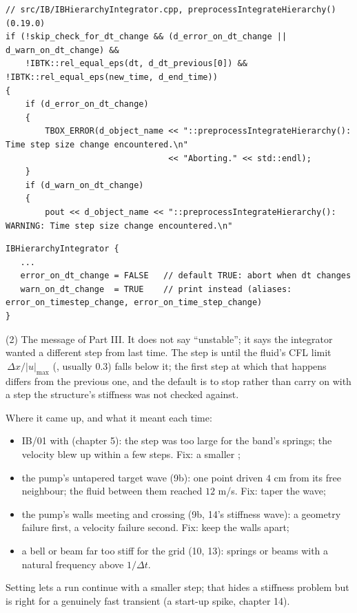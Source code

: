 \documentclass[aspectratio=169,11pt]{beamer}
\begin{document}
\begin{frame}[fragile]{}
\label{fr:cfl}
\begin{lstlisting}[style=cpptiny]
// src/IB/IBHierarchyIntegrator.cpp, preprocessIntegrateHierarchy() (0.19.0)
if (!skip_check_for_dt_change && (d_error_on_dt_change || d_warn_on_dt_change) &&
    !IBTK::rel_equal_eps(dt, d_dt_previous[0]) && !IBTK::rel_equal_eps(new_time, d_end_time))
{
    if (d_error_on_dt_change)
    {
        TBOX_ERROR(d_object_name << "::preprocessIntegrateHierarchy():  Time step size change encountered.\n"
                                 << "Aborting." << std::endl);
    }
    if (d_warn_on_dt_change)
    {
        pout << d_object_name << "::preprocessIntegrateHierarchy():  WARNING: Time step size change encountered.\n"
\end{lstlisting}
\begin{lstlisting}[style=inputtiny]
IBHierarchyIntegrator {
   ...
   error_on_dt_change = FALSE   // default TRUE: abort when dt changes
   warn_on_dt_change  = TRUE    // print instead (aliases: error_on_timestep_change, error_on_time_step_change)
}
\end{lstlisting}

\end{frame}

\begin{frame}[fragile]{ (2)}
\label{fr:cfl2}
\footnotesize The message of Part III. It does not say ``unstable''; it says the integrator wanted a different step from last time. The step is  until the fluid's CFL limit $\,\Delta x/|u|_{\max}$ (, usually $0.3$) falls below it; the first step at which that happens differs from the previous one, and the default is to stop rather than carry on with a step the structure's stiffness was not checked against.
\vspace{1mm}

\footnotesize Where it came up, and what it meant each time:
\begin{itemize}\scriptsize
  \item IB/01 with  (chapter 5): the step was too large for the band's springs; the velocity blew up within a few steps. Fix: a smaller ;
  \item the pump's untapered target wave (9b): one point driven $4$ cm from its free neighbour; the fluid between them reached $12$ m/s. Fix: taper the wave;
  \item the pump's walls meeting and crossing (9b, 14's stiffness wave): a geometry failure first, a velocity failure second. Fix: keep the walls apart;
  \item a bell or beam far too stiff for the grid (10, 13): springs or beams with a natural frequency above $1/\Delta t$.
\end{itemize}
\scriptsize Setting  lets a run continue with a smaller step; that hides a stiffness problem but is right for a genuinely fast transient (a start-up spike, chapter 14).
\end{frame}
\end{document}

